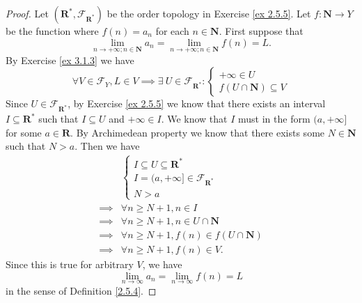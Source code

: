 \begin{proof}
    Let \((\mathbf{R}^*, \mathcal{F}_{\mathbf{R}^*})\) be the order topology in Exercise \ref{ex 2.5.5}.
    Let \(f : \mathbf{N} \to Y\) be the function where \(f(n) = a_n\) for each \(n \in \mathbf{N}\).
    First suppose that
    \[
        \lim_{n \to +\infty ; n \in \mathbf{N}} a_n = \lim_{n \to +\infty ; n \in \mathbf{N}} f(n) = L.
    \]
    By Exercise \ref{ex 3.1.3} we have
    \[
        \forall V \in \mathcal{F}_Y, L \in V \implies \exists\ U \in \mathcal{F}_{\mathbf{R}^*} : \begin{cases}
            +\infty \in U \\
            f(U \cap \mathbf{N}) \subseteq V
        \end{cases}
    \]
    Since \(U \in \mathcal{F}_{\mathbf{R}^*}\), by Exercise \ref{ex 2.5.5} we know that there exists an interval \(I \subseteq \mathbf{R}^*\) such that \(I \subseteq U\) and \(+\infty \in I\).
    We know that \(I\) must in the form \((a, +\infty]\) for some \(a \in \mathbf{R}\).
    By Archimedean property we know that there exists some \(N \in \mathbf{N}\) such that \(N > a\).
    Then we have
    \begin{align*}
                 & \begin{cases}
                       I \subseteq U \subseteq \mathbf{R}^*            \\
                       I = (a, +\infty] \in \mathcal{F}_{\mathbf{R}^*} \\
                       N > a
                   \end{cases}     \\
        \implies & \forall n \geq N + 1, n \in I                       \\
        \implies & \forall n \geq N + 1, n \in U \cap \mathbf{N}       \\
        \implies & \forall n \geq N + 1, f(n) \in f(U \cap \mathbf{N}) \\
        \implies & \forall n \geq N + 1, f(n) \in V.
    \end{align*}
    Since this is true for arbitrary \(V\), we have
    \[
        \lim_{n \to \infty} a_n = \lim_{n \to \infty} f(n) = L
    \]
    in the sense of Definition \ref{2.5.4}.


\end{proof}
